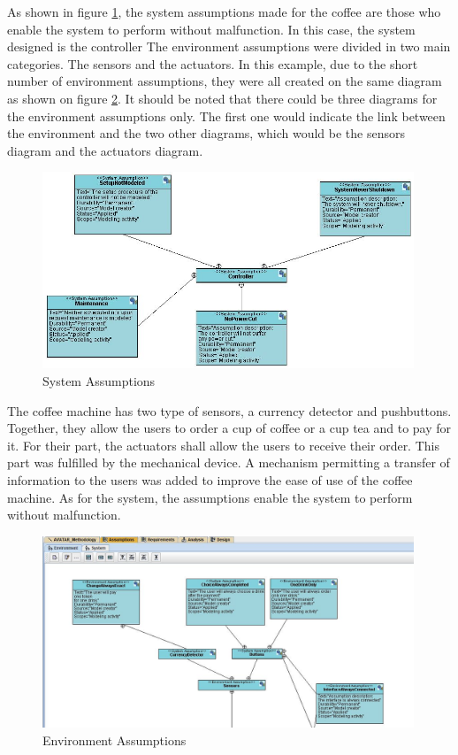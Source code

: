 \documentclass[12pt]{article}
\begin{document}
As shown in figure \ref{fig:systemassumptions}, the system assumptions made for the coffee are those who enable the system to perform without malfunction. In this case, the system designed is the controller
The environment assumptions were divided in two main categories. The sensors and the actuators. In this example, due to the short number of environment assumptions, they were all created on the same diagram as shown on figure \ref{fig:envassumptions}. It should be noted that there could be three diagrams for the environment assumptions only. The first one would indicate the link between the environment and the two other diagrams, which would be the sensors diagram and the actuators diagram.
\begin{figure}[htbp]
\centering
\includegraphics[width=0.99\textwidth]{fig/systemassumptions.jpg}
\caption{System Assumptions} \label{fig:systemassumptions}
\end{figure}

The coffee machine has two type of sensors, a currency detector and pushbuttons. Together, they allow the users to order a cup of coffee or a cup tea and to pay for it. For their part, the actuators shall allow the users to receive their order. This part was fulfilled by the mechanical device. A mechanism permitting a transfer of information to the users was added to improve the ease of use of the coffee machine. As for the system, the assumptions enable the system to perform without malfunction.

\begin{figure}[htbp]
\centering
\includegraphics[width=0.99\textwidth]{fig/environmentassumptions.jpg}
\caption{Environment Assumptions} \label{fig:envassumptions}
\end{figure}
\end{document}
